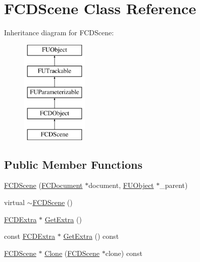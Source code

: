 \hypertarget{classFCDScene}{
\section{FCDScene Class Reference}
\label{classFCDScene}
}
Inheritance diagram for FCDScene:\begin{figure}[H]
\begin{center}
\leavevmode
\includegraphics[height=5.000000cm]{classFCDScene}
\end{center}
\end{figure}
\subsection*{Public Member Functions}
\begin{DoxyCompactItemize}
\item 
\hyperlink{classFCDScene_ad4f4dd497f1cd54338deebd7daf79921}{FCDScene} (\hyperlink{classFCDocument}{FCDocument} $\ast$document, \hyperlink{classFUObject}{FUObject} $\ast$\_\-parent)
\item 
virtual \hyperlink{classFCDScene_af0a77cb28f0409af9ae6f3c42dc82f76}{$\sim$FCDScene} ()
\item 
\hyperlink{classFCDExtra}{FCDExtra} $\ast$ \hyperlink{classFCDScene_a47230b81d898e8f576c9ef70abbbb2cf}{GetExtra} ()
\item 
const \hyperlink{classFCDExtra}{FCDExtra} $\ast$ \hyperlink{classFCDScene_a09a6d605d9959aa7741ede116243e885}{GetExtra} () const 
\item 
\hyperlink{classFCDScene}{FCDScene} $\ast$ \hyperlink{classFCDScene_a1881dfd099f7500c2359f8fc90545036}{Clone} (\hyperlink{classFCDScene}{FCDScene} $\ast$clone) const 
\end{DoxyCompactItemize}


